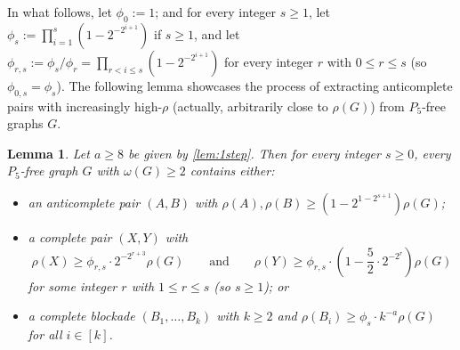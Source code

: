 \documentclass[11pt,reqno]{amsart}
\newtheorem{lemma}[theorem]{Lemma}
\begin{document}
	In what follows, let $\phi_0:=1$; and
	for every integer $s\ge1$, let $\phi_s:=\prod_{i=1}^{s}(1-2^{-2^{i+1}})$ if $s\ge1$,
	and let $\phi_{r,s}:=\phi_s/\phi_r=\prod_{r<i\le s}(1-2^{-2^{i+1}})$ for every integer $r$ with $0\le r\le s$ (so $\phi_{0,s}=\phi_s$).
	The following lemma showcases the process of extracting anticomplete pairs with increasingly high-$\rho$ (actually, arbitrarily close to $\rho(G)$) from $P_5$-free graphs $G$.
	\begin{lemma}
		\label{lem:incrho}
		Let $a\ge8$ be given by \cref{lem:1step}. Then for every integer $s\ge0$, every $P_5$-free graph $G$ with $\omega(G)\ge2$ contains either:
		\begin{itemize}
			\item an anticomplete pair $(A,B)$ with $\rho(A),\rho(B)\ge(1-2^{1-2^{s+1}})\rho(G)$;
			
			\item a complete pair $(X,Y)$ with
			$$\rho(X)\ge \phi_{r,s}\cdot2^{-2^{r+3}}\rho(G)
			\qquad\text{and}\qquad
			\rho(Y)\ge \phi_{r,s}\cdot\left(1-\frac52\cdot2^{-2^{r}}\right)\rho(G)$$
			for some integer $r$ with $1\le r\le s$ (so $s\ge1$); or
			
			\item a complete blockade $(B_1,\ldots,B_k)$ with $k\ge2$ and $\rho(B_i)\ge \phi_s\cdot k^{-a}\rho(G)$ for all $i\in[k]$.
		\end{itemize}
	\end{lemma}
\end{document}

